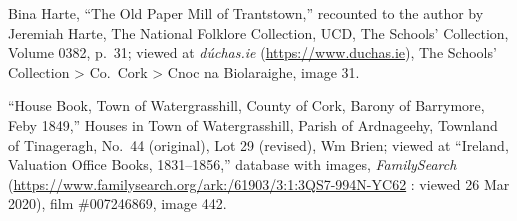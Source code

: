 \begin{thebibliography}{999}
Bina Harte, ``The Old Paper Mill of Trantstown,'' recounted to the author by Jeremiah Harte, The National Folklore Collection, UCD, The Schools' Collection, Volume 0382, p.\ 31; viewed at \textit{d\'{u}chas.ie} (\url{https://www.duchas.ie}), The Schools' Collection > Co.\ Cork > Cnoc na Biolaraighe, image 31.

``House Book, Town of Watergrasshill, County of Cork, Barony of Barrymore, Feby 1849,'' Houses in Town of Watergrasshill, Parish of Ardnageehy, Townland of Tinageragh, No.\ 44 (original), Lot 29 (revised), Wm Brien; viewed at ``Ireland, Valuation Office Books, 1831--1856,'' database with images, \textit{FamilySearch} (\url{https://www.familysearch.org/ark:/61903/3:1:3QS7-994N-YC62} : viewed 26 Mar 2020), film \#007246869, image 442.

\end{thebibliography}

